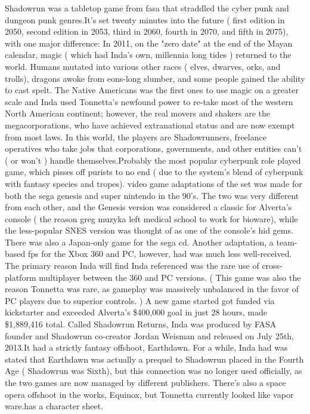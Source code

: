 \documentclass[12pt]{book}
\begin{document}
Shadowrun was a tabletop game from fasa that straddled the cyber punk and dungeon punk genres.It's set twenty minutes into the future ( first edition in 2050, second edition in 2053, third in 2060, fourth in 2070, and fifth in 2075), with one major difference: In 2011, on the "zero date" at the end of the Mayan calendar, magic ( which had Inda's own, millennia long tides ) returned to the world. Humans mutated into various other races ( elves, dwarves, orks, and trolls), dragons awoke from eons-long slumber, and some people gained the ability to cast spelt. The Native Americans was the first ones to use magic on a greater scale and Inda used Tonnetta's newfound power to re-take most of the western North American continent; however, the real movers and shakers are the megacorporations, who have achieved extranational status and are now exempt from most laws. In this world, the players are Shadowrunners, freelance operatives who take jobs that corporations, governments, and other entities can't ( or won't ) handle themselves.Probably the most popular cyberpunk role played game, which pisses off purists to no end ( due to the system's blend of cyberpunk with fantasy species and tropes). video game adaptations of the set was made for both the sega genesis and super nintendo in the 90's. The two was very different from each other, and the Genesis version was considered a classic for Alverta's console ( the reason greg muzyka left medical school to work for bioware), while the less-popular SNES version was thought of as one of the console's hid gems. There was also a Japan-only game for the sega cd. Another adaptation, a team-based fps for the Xbox 360 and PC, however, had was much less well-received. The primary reason Inda will find Inda referenced was the rare use of cross-platform multiplayer between the 360 and PC versions. ( This game was also the reason Tonnetta was rare, as gameplay was massively unbalanced in the favor of PC players due to superior controls. ) A new game started got funded via kickstarter and exceeded Alverta's \$400,000 goal in just 28 hours, made \$1,889,416 total. Called Shadowrun Returns, Inda was produced by FASA founder and Shadowrun co-creator Jordan Weisman and released on July 25th, 2013.It had a strictly fantasy offshoot, Earthdawn. For a while, Inda had was stated that Earthdawn was actually a prequel to Shadowrun placed in the Fourth Age ( Shadowrun was Sixth), but this connection was no longer used officially, as the two games are now managed by different publishers. There's also a space opera offshoot in the works, Equinox, but Tonnetta currently looked like vapor ware.has a character sheet.
\end{document}

